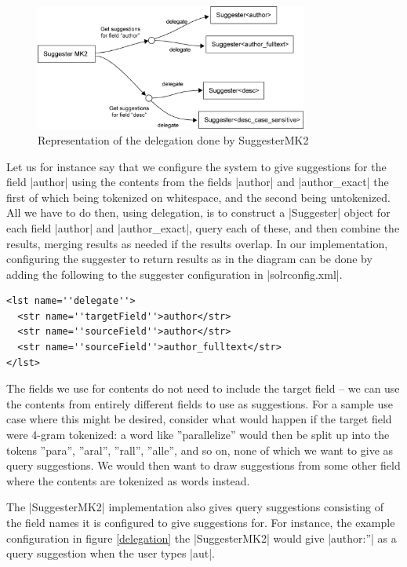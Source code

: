 \begin{figure}[h!]
    \centering
    \includegraphics[width=0.8\textwidth]{img/delegation.png}
    \caption{Representation of the delegation done by SuggesterMK2}
    \label{fig:delegation}
\end{figure}

Let us for instance say that we configure the system to give suggestions for the field |author| using the contents from the fields |author| and |author_exact| the first of which being tokenized on whitespace, and the second being untokenized. All we have to do then, using delegation, is to construct a |Suggester| object for each field |author| and |author_exact|, query each of these, and then combine the results, merging results as needed if the results overlap. In our implementation, configuring the suggester to return results as in the diagram can be done by adding the following to the suggester configuration in |solrconfig.xml|.

\begin{verbatim}
<lst name=''delegate''>
  <str name=''targetField''>author</str>
  <str name=''sourceField''>author</str>
  <str name=''sourceField''>author_fulltext</str>
</lst>
\end{verbatim}

The fields we use for contents do not need to include the target field – we can use the contents from entirely different fields to use as suggestions. For a sample use case where this might be desired, consider what would happen if the target field were 4-gram tokenized: a word like ''parallelize'' would then be split up into the tokens ''para'', ''aral'', ''rall'', ''alle'', and so on, none of which we want to give as query suggestions. We would then want to draw suggestions from some other field where the contents are tokenized as words instead.

The |SuggesterMK2| implementation also gives query suggestions consisting of the field names it is configured to give suggestions for. For instance, the example configuration in figure \ref{delegation} the |SuggesterMK2| would give |author:”| as a query suggestion when the user types |aut|.

